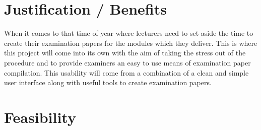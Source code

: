 \section{Justification / Benefits}

When it comes to that time of year where lecturers need to set aside the time to create their examination papers for the modules which they deliver. This is where this project will come into its own with the aim of taking the stress out of the procedure and to provide examiners an easy to use means of examination paper compilation. This usability will come from a combination of a clean and simple user interface along with useful tools to create examination papers.

\section{Feasibility}

